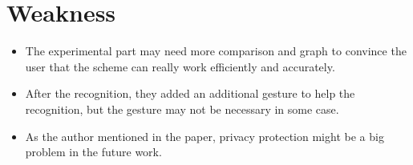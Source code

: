 \documentclass{article}
\begin{document}
\section{Weakness}
\begin{itemize}
\item The experimental part may need more comparison and graph to convince the user that the scheme can really work efficiently and accurately.
\item After the recognition, they added an additional gesture to help the recognition, but the gesture may not be necessary in some case.
\item As the author mentioned in the paper, privacy protection might be a big problem in the future work.
\end{itemize}


\end{document}
